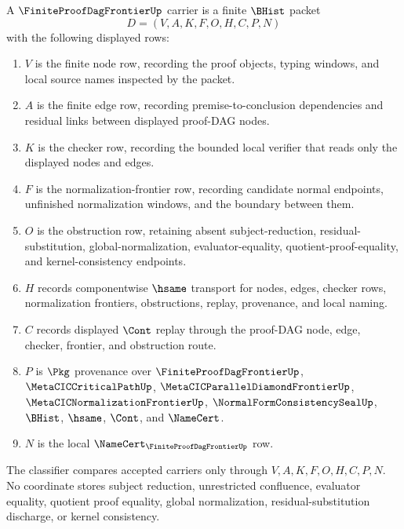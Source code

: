 \begin{definition}
\label{def:finite-proof-dag-frontier-carrier}
A $\FiniteProofDagFrontierUp$ carrier is a finite $\BHist$ packet
$$
D=(V,A,K,F,O,H,C,P,N)
$$
with the following displayed rows:
\begin{enumerate}
\item $V$ is the finite node row, recording the proof objects, typing windows, and local source names inspected by the packet.
\item $A$ is the finite edge row, recording premise-to-conclusion dependencies and residual links between displayed proof-DAG nodes.
\item $K$ is the checker row, recording the bounded local verifier that reads only the displayed nodes and edges.
\item $F$ is the normalization-frontier row, recording candidate normal endpoints, unfinished normalization windows, and the boundary between them.
\item $O$ is the obstruction row, retaining absent subject-reduction, residual-substitution, global-normalization, evaluator-equality, quotient-proof-equality, and kernel-consistency endpoints.
\item $H$ records componentwise $\hsame$ transport for nodes, edges, checker rows, normalization frontiers, obstructions, replay, provenance, and local naming.
\item $C$ records displayed $\Cont$ replay through the proof-DAG node, edge, checker, frontier, and obstruction route.
\item $P$ is $\Pkg$ provenance over $\FiniteProofDagFrontierUp$, $\MetaCICCriticalPathUp$, $\MetaCICParallelDiamondFrontierUp$, $\MetaCICNormalizationFrontierUp$, $\NormalFormConsistencySealUp$, $\BHist$, $\hsame$, $\Cont$, and $\NameCert$.
\item $N$ is the local $\NameCert_{\FiniteProofDagFrontierUp}$ row.
\end{enumerate}
The classifier compares accepted carriers only through $V,A,K,F,O,H,C,P,N$. No coordinate stores subject reduction, unrestricted confluence, evaluator equality, quotient proof equality, global normalization, residual-substitution discharge, or kernel consistency.
\end{definition}

